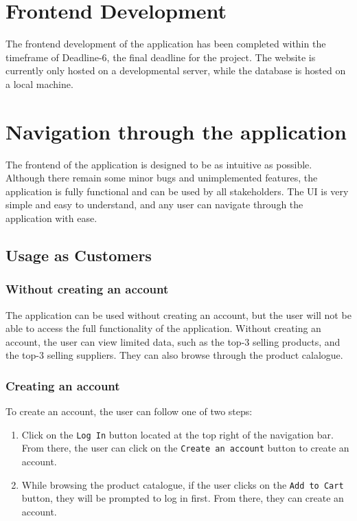\documentclass[12pt]{report}
\begin{document}
    \section*{\Huge Frontend Development}
    \vspace*{10pt}

    The frontend development of the application has been completed within the timeframe of Deadline-6, the final deadline for the project.
    The website is currently only hosted on a developmental server, while the database is hosted on a local machine.

    \section*{\Huge Navigation through the application}
    \vspace*{10pt}

    The frontend of the application is designed to be as intuitive as possible.
    Although there remain some minor bugs and unimplemented features, the application is fully functional and can be used by all stakeholders.
    The UI is very simple and easy to understand, and any user can navigate through the application with ease.

    \subsection*{Usage as Customers}
    \subsubsection*{Without creating an account}
    The application can be used without creating an account, but the user will not be able to access the full functionality of the application.
    Without creating an account, the user can view limited data, such as the top-3 selling products, and the top-3 selling suppliers.
    They can also browse through the product calalogue.

    \subsubsection*{Creating an account}
    To create an account, the user can follow one of two steps:
    \begin{enumerate}
        \item
        Click on the \texttt{Log In} button located at the top right of the navigation bar.
        From there, the user can click on the \texttt{Create an account} button to create an account.
        \item
        While browsing the product catalogue, if the user clicks on the \texttt{Add to Cart} button, they will be prompted to log in first.
        From there, they can create an account.
    \end{enumerate}
\end{document}
